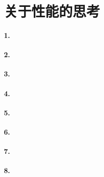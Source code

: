 \documentclass[UTF8,a4paper,8pt]{ctexart}
\begin{document}
\section*{关于性能的思考}       
  	 \paragraph{1.} 
  	 \paragraph{2.}
  	 \paragraph{3.}
  	 \paragraph{4.}
  	 \paragraph{5.}
  	 \paragraph{6.}
  	 \paragraph{7.}
  	 \paragraph{8.}
  	 
\end{document}
